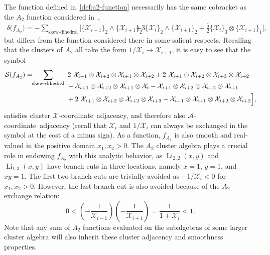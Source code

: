 \documentclass[12pt]{article}
\DeclareMathOperator{\Li}{Li}
\def\x{\mathcal{X}}
\def\xcoord{$\mathcal{X}$-coordinate}
\def\xcoords{$\mathcal{X}$-coordinates}
\def\acoord{$\mathcal{A}$-coordinate}
\begin{document}
The function defined in~\eqref{def:a2-function} necessarily has the same cobracket as the $A_2$ function considered in~\cite{Golden:2014xqa},
\begin{align} \label{eq:A2_cobracket}
	\delta\big(f_{A_2}\big) = -\! \! \! \sum_{\text{skew-dihedral}} \Big[ \{\x_{i-1}\}_2 \wedge \{\x_{i+1}\}_2 &+ 3\{\x_{i}\}_2 \wedge \{\x_{i+1}\}_2+ \frac{5}{2}\{\x_{i}\}_3 \otimes \{\x_{i+1} \}_1 \Big], \nonumber
\end{align}
but differs from the function considered there in some salient respects. Recalling that the clusters of $A_2$ all take the form $1/\x_i\to \x_{i+1}$, it is easy to see that the symbol
\begin{align}
   {\cal S}(f_{A_2}) = \!\! \sum_{\text{skew-dihedral}} &\Big[ 2 \ \x_{i+1}\otimes\x_{i+2}\otimes\x_{i+1}\otimes\x_{i+2} + 2 \ \x_{i+1}\otimes\x_{i+2}\otimes\x_{i+3}\otimes\x_{i+2} \nonumber \\[-.3cm]
&\ - \x_{i+1}\otimes\x_{i+2}\otimes\x_{i+1}\otimes\x_{i} - \x_{i+1}\otimes\x_{i+2}\otimes\x_{i+2}\otimes\x_{i+1}  \\
&\ + 2 \ \x_{i+1}\otimes\x_{i+2}\otimes\x_{i+2}\otimes\x_{i+3}  - \x_{i+1}\otimes\x_{i+1}\otimes\x_{i+2}\otimes\x_{i+2} \Big], \nonumber
\end{align}
satisfies cluster \xcoord\ adjacency, and therefore also \acoord\ adjacency (recall that $\x_i$ and $1/\x_i$ can always be exchanged in the symbol at the cost of a minus sign). As a function, $f_{A_2}$ is also smooth and real-valued in the positive domain $x_1, x_2>0$. The $A_2$ cluster algebra plays a crucial role in endowing $f_{A_2}$ with this analytic behavior, as $\Li_{2,2}(x,y)$ and $\Li_{1,3}(x,y)$ have branch cuts in three locations, namely $x=1$, $y=1$, and $xy=1$. The first two branch cuts are trivially avoided as $-1/\x_i<0$ for $x_1,x_2>0$. However, the last branch cut is also avoided because of the $A_2$ exchange relation: 
\begin{equation}
	0<\left(-\frac{1}{\x_{i-1}}\right)\left(-\frac{1}{\x_{i+1}}\right) = \frac{1}{1+\x_i}<1.
\end{equation}
Note that any sum of $A_2$ functions evaluated on the subalgebras of some larger cluster algebra will also inherit these cluster adjacency and smoothness properties. 

\end{document}
